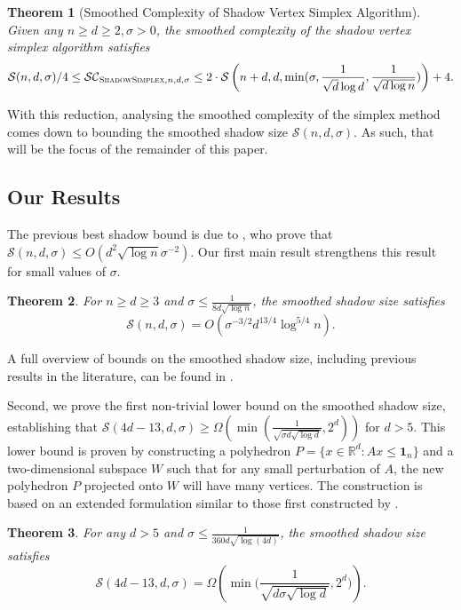 \documentclass{article}\usepackage[a4paper,margin=20mm]{geometry}
\newtheorem{theorem}{Theorem}\newtheorem{lemma}[theorem]{Lemma}\newtheorem{proposition}[theorem]{Proposition}\newtheorem{corollary}[theorem]{Corollary}\newtheorem{definition}[theorem]{Definition}\newtheorem{claim}[theorem]{Claim}\newtheorem{remark}[theorem]{Remark}\newtheorem{observation}[theorem]{Observation}\newtheorem{conjecture}[theorem]{Conjecture}\newtheorem{example}[theorem]{Example}
\newcommand{\R}{\mathbb R}
\begin{document}
\begin{theorem}[Smoothed Complexity of Shadow Vertex Simplex Algorithm]
    Given any $n \geq d \geq 2, \sigma > 0$, the smoothed complexity of the shadow vertex simplex algorithm satisfies
    \begin{align*}
        \mathcal{S}(n, d, \sigma)/4 \leq \mathcal{SC}_{\textsc{ShadowSimplex}, n, d, \sigma} \leq 2\cdot\mathcal{S}\left(n + d, d, \min(\sigma, \frac{1}{\sqrt{d} \log d}, \frac{1}{\sqrt{d \log n}}) \right) + 4.
    \end{align*}
\end{theorem}

With this reduction, analysing the smoothed complexity of the simplex method
comes down to bounding the smoothed shadow size $\mathcal S(n,d,\sigma)$.
As such, that will be the focus of the remainder of this paper.

\subsection{Our Results}
The previous best shadow bound is due to \cite{DH18}, who prove that $\mathcal S(n,d,\sigma) \leq O(d^2 \sqrt{\log n}\sigma^{-2})$.
Our first main result strengthens this result for small values of $\sigma$.
\begin{theorem}
    For $n \geq d \geq 3$ and $\sigma \leq \frac{1}{8d\sqrt{\log n}}$,
    the smoothed shadow size satisfies
    \[
        \mathcal S(n,d,\sigma) = O\left( \sigma^{-3/2} d^{13/4} \log^{5/4} n \right).
    \]
\end{theorem}
A full overview of bounds on the smoothed shadow size, including previous results in the literature, can be found in
.

Second, we prove the first non-trivial lower bound on the smoothed shadow size, establishing that
$\mathcal S(4d-13,d,\sigma) \geq \Omega(\min(\frac{1}{\sqrt{\sigma d \sqrt{\log d}}}, 2^d))$
for $d > 5$. This lower bound is proven by constructing a polyhedron
$P = \{x \in \R^d : Ax \leq \mathbf 1_n\}$ and a two-dimensional subspace $W$ such that
for any small perturbation of $A$, the new polyhedron $P$ projected onto $W$ will have many vertices.
The construction is based on an extended formulation similar to those first constructed by
\cite{BN01, glineur}.
\begin{theorem}
    For any $d > 5$ and $\sigma \leq \frac{1}{360d\sqrt{\log(4d)}}$,
    the smoothed shadow size satisfies
    \[
        \mathcal S(4d-13,d,\sigma) = \Omega \left(\min \Big(\frac{1}{\sqrt{d\sigma\sqrt{\log d}}},2^d \Big) \right).
    \]
\end{theorem}
\end{document}
